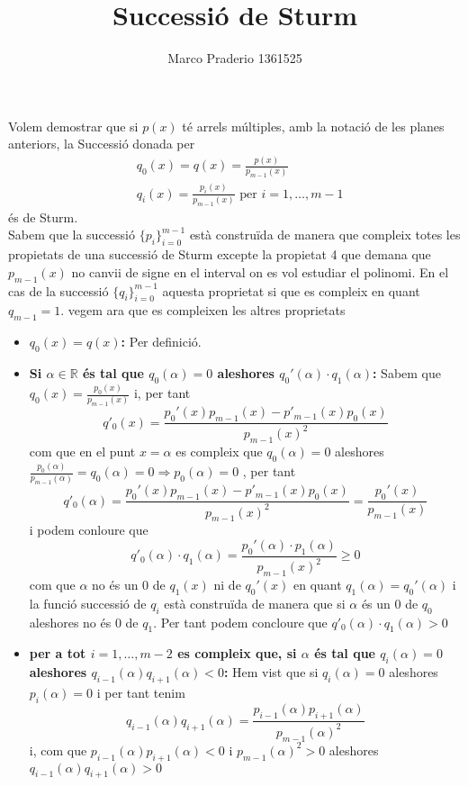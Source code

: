 \documentclass[a4paper,10pt]{article}
\title{Successió de Sturm}
\author{Marco Praderio 1361525}
\date{}
\renewcommand{\*}{\cdot}
\renewcommand{\a}{\alpha}
\renewcommand{\r}{\mathbb{R}}
\begin{document}
 \maketitle
 Volem demostrar que si $p(x)$ té arrels múltiples, amb la notació de les planes anteriors, la Successió donada per
 \begin{equation*}
 \begin{split}
  &q_0(x)=q(x)=\frac{p(x)}{p_{m-1}(x)}\\
  &q_i(x)=\frac{p_i(x)}{p_{m-1}(x)}\text{ per }i=1,\dots,m-1
 \end{split}
\end{equation*}
és de Sturm.\\
Sabem que la successió $\{p_i\}_{i=0}^{m-1}$ està construïda de manera que compleix totes les propietats de una successió de Sturm excepte la propietat 4 que demana que
$p_{m-1}(x)$ no canvii de signe en el interval on es vol estudiar el polinomi. En el cas de la successió $\{q_i\}_{i=0}^{m-1}$ aquesta proprietat si que es compleix en quant
$q_{m-1}=1$. vegem ara que es compleixen les altres proprietats
\begin{itemize}
\item \textbf{$q_0(x)=q(x)$:} Per definició.
 \item \textbf{Si $\a\in\r$ és tal que $q_0(\a)=0$ aleshores $q_0'(\a)\*q_1(\a)$:} Sabem que $q_0(x)=\frac{p_0(x)}{p_{m-1}(x)}$ i, per tant
 $$q'_0(x)=\frac{p_0'(x)p_{m-1}(x)-p'_{m-1}(x)p_0(x)}{p_{m-1}(x)^2}$$
 com que en el punt $x=\a$ es compleix que $q_0(\a)=0$ aleshores $\frac{p_0(\a)}{p_{m-1}(\a)}=q_0(\a)=0 \Rightarrow p_0(\a)=0$ , per tant
 $$q'_0(\a)=\frac{p_0'(x)p_{m-1}(x)-p'_{m-1}(x)p_0(x)}{p_{m-1}(x)^2}=\frac{p_0'(x)}{p_{m-1}(x)}$$
 i podem conloure que $$q'_0(\a)\*q_1(\a)=\frac{p_0'(\a)\*p_1(\a)}{p_{m-1}(x)^2}\ge 0$$ com que $\a$ no és un 0 de $q_1(x)$ ni de $q_0'(x)$ en quant $q_1(\a)=q_0'(\a)$ i la
 funció successió de $q_i$ està construïda de manera que si $\a$ és un 0 de $q_0$ aleshores no és 0 de $q_1$. Per tant podem concloure que $q'_0(\a)\*q_1(\a)>0$
 \item \textbf{per a tot $i=1,\dots,m-2$ es compleix que, si $\a$ és tal que $q_i(\a)=0$ aleshores $q_{i-1}(\a)q_{i+1}(\a)<0$:} Hem vist que si $q_i(\a)=0$ aleshores
 $p_i(\a)=0$ i per tant tenim
 \begin{equation*}
  q_{i-1}(\a)q_{i+1}(\a)=\frac{p_{i-1}(\a)p_{i+1}(\a)}{p_{m-1}(\a)^2}
 \end{equation*}
 i, com que $p_{i-1}(\a)p_{i+1}(\a)<0$ i $p_{m-1}(\a)^2>0$ aleshores $q_{i-1}(\a)q_{i+1}(\a)>0$
\end{itemize}
\end{document}
